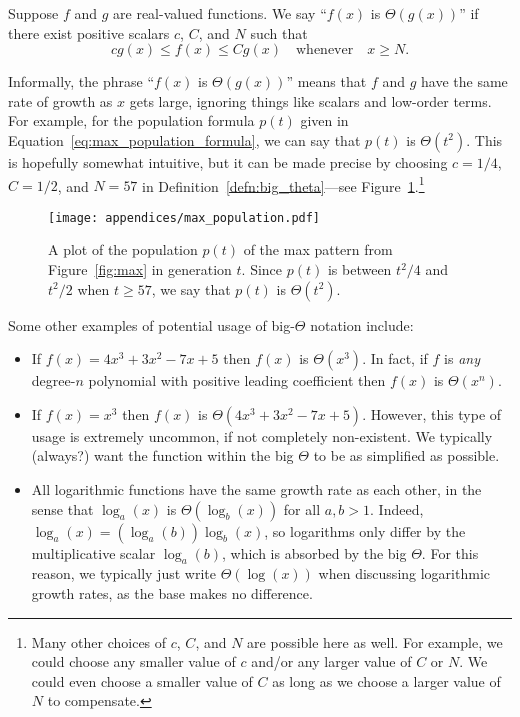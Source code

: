 \begin{definition}\label{defn:big_theta}
	Suppose $f$ and $g$ are real-valued functions. We say ``$f(x)$ is $\Theta(g(x))$'' if there exist positive scalars $c$, $C$, and $N$ such that
	\[
		cg(x) \leq f(x) \leq Cg(x) \quad \text{whenever} \quad x \geq N.
	\]
\end{definition}

Informally, the phrase ``$f(x)$ is $\Theta(g(x))$'' means that $f$ and $g$ have the same rate of growth as $x$ gets large, ignoring things like scalars and low-order terms. For example, for the population formula $p(t)$ given in Equation~\eqref{eq:max_population_formula}, we can say that $p(t)$ is $\Theta(t^2)$. This is hopefully somewhat intuitive, but it can be made precise by choosing $c = 1/4$, $C = 1/2$, and $N = 57$ in Definition~\ref{defn:big_theta}---see Figure~\ref{fig:max_population_graph}.\footnote{Many other choices of $c$, $C$, and $N$ are possible here as well. For example, we could choose any smaller value of $c$ and/or any larger value of $C$ or $N$. We could even choose a smaller value of $C$ as long as we choose a larger value of $N$ to compensate.}

\begin{figure}[!htbp]
	\centering
	\texttt{[image: appendices/max\_population.pdf]}
	\caption{A plot of the population $p(t)$ of the max pattern from Figure~\ref{fig:max} in generation $t$. Since $p(t)$ is between $t^2/4$ and $t^2/2$ when $t \geq 57$, we say that $p(t)$ is $\Theta(t^2)$.}\label{fig:max_population_graph}
\end{figure}

Some other examples of potential usage of big-$\Theta$ notation include:\smallskip

\begin{itemize}
	\item If $f(x) = 4x^3 + 3x^2 - 7x + 5$ then $f(x)$ is $\Theta(x^3)$. In fact, if $f$ is \emph{any} degree-$n$ polynomial with positive leading coefficient then $f(x)$ is $\Theta(x^n)$.\smallskip
	
	\item If $f(x) = x^3$ then $f(x)$ is $\Theta(4x^3 + 3x^2 - 7x + 5)$. However, this type of usage is extremely uncommon, if not completely non-existent. We typically (always?) want the function within the big $\Theta$ to be as simplified as possible.\smallskip
	
	\item All logarithmic functions have the same growth rate as each other, in the sense that $\log_a(x)$ is $\Theta(\log_b(x))$ for all $a,b > 1$. Indeed, $\log_a(x) = (\log_a(b))\log_b(x)$, so logarithms only differ by the multiplicative scalar $\log_a(b)$, which is absorbed by the big $\Theta$. For this reason, we typically just write $\Theta(\log(x))$ when discussing logarithmic growth rates, as the base makes no difference.
\end{itemize}
